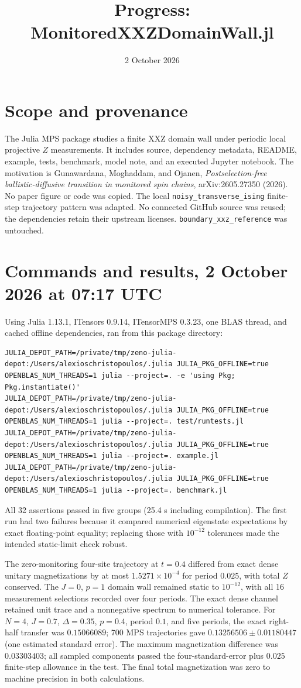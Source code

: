 \documentclass[11pt]{article}
\title{Progress: MonitoredXXZDomainWall.jl}
\date{2 October 2026}
\begin{document}
\maketitle
\section*{Scope and provenance}
The Julia MPS package studies a finite XXZ domain wall under periodic local projective $Z$
measurements. It includes source, dependency metadata, README, example,
tests, benchmark, model note, and an executed Jupyter notebook. The
motivation is Gunawardana, Moghaddam, and Ojanen,
\textit{Postselection-free ballistic-diffusive transition in monitored spin
chains}, arXiv:2605.27350 (2026). No paper figure or code was copied.
The local \texttt{noisy\_transverse\_ising} finite-step trajectory pattern
was adapted. No connected GitHub source was reused; the dependencies retain
their upstream licenses. \texttt{boundary\_xxz\_reference} was untouched.
\section*{Commands and results, 2 October 2026 at 07:17 UTC}
Using Julia 1.13.1, ITensors 0.9.14, ITensorMPS 0.3.23, one BLAS thread,
and cached offline dependencies, ran from this package directory:
\begin{verbatim}
JULIA_DEPOT_PATH=/private/tmp/zeno-julia-depot:/Users/alexioschristopoulos/.julia JULIA_PKG_OFFLINE=true OPENBLAS_NUM_THREADS=1 julia --project=. -e 'using Pkg; Pkg.instantiate()'
JULIA_DEPOT_PATH=/private/tmp/zeno-julia-depot:/Users/alexioschristopoulos/.julia JULIA_PKG_OFFLINE=true OPENBLAS_NUM_THREADS=1 julia --project=. test/runtests.jl
JULIA_DEPOT_PATH=/private/tmp/zeno-julia-depot:/Users/alexioschristopoulos/.julia JULIA_PKG_OFFLINE=true OPENBLAS_NUM_THREADS=1 julia --project=. example.jl
JULIA_DEPOT_PATH=/private/tmp/zeno-julia-depot:/Users/alexioschristopoulos/.julia JULIA_PKG_OFFLINE=true OPENBLAS_NUM_THREADS=1 julia --project=. benchmark.jl
\end{verbatim}
All 32 assertions passed in five groups (25.4 s including compilation).
The first run had two failures because it compared numerical eigenstate
expectations by exact floating-point equality; replacing those with
$10^{-12}$ tolerances made the intended static-limit check robust.

The zero-monitoring four-site trajectory at $t=0.4$ differed from exact
dense unitary magnetizations by at most $1.5271\times10^{-4}$ for period
$0.025$, with total $Z$ conserved. The $J=0$, $p=1$ domain wall remained
static to $10^{-12}$, with all 16 measurement selections recorded over four
periods. The exact dense channel retained unit trace and a nonnegative
spectrum to numerical tolerance. For $N=4$, $J=0.7$, $\Delta=0.35$,
$p=0.4$, period $0.1$, and five periods, the exact right-half transfer was
$0.15066089$; 700 MPS trajectories gave $0.13256506\pm0.01180447$
(one estimated standard error). The maximum magnetization difference was
$0.03303403$; all sampled components passed the four-standard-error plus
$0.025$ finite-step allowance in the test. The final total magnetization
was zero to machine precision in both calculations.
\end{document}
